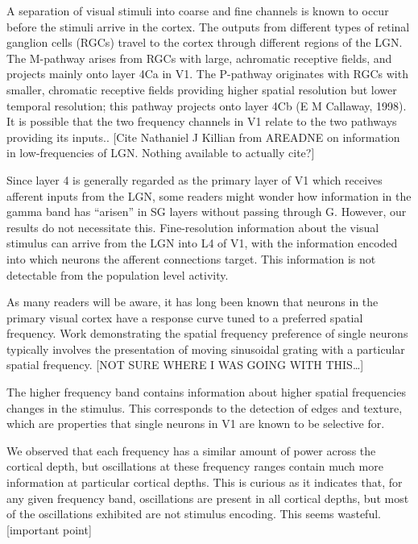 \documentclass{article}
\begin{document}
A separation of visual stimuli into coarse and fine channels is known to occur before the stimuli arrive in the cortex. The outputs from different types of retinal ganglion cells (RGCs) travel to the cortex through different regions of the LGN. The M-pathway arises from RGCs with large, achromatic receptive fields, and projects mainly onto layer 4C\textgreek{a }in V1. The P-pathway originates with RGCs with smaller, chromatic receptive fields providing higher spatial resolution but lower temporal resolution; this pathway projects onto layer 4C\textgreek{b (}E M Callaway, 1998). It is possible that the two frequency channels in V1 relate to the two pathways providing its inputs.. [Cite Nathaniel J Killian from AREADNE on information in low-frequencies of LGN. Nothing available to actually cite?]

Since layer 4 is generally regarded as the primary layer of V1 which receives afferent inputs from the LGN, some readers might wonder how information in the gamma band has ``arisen'' in SG layers without passing through G. However, our results do not necessitate this. Fine-resolution information about the visual stimulus can arrive from the LGN into L4 of V1, with the information encoded into which neurons the afferent connections target. This information is not detectable from the population level activity. 

As many readers will be aware, it has long been known that neurons in the primary visual cortex have a response curve tuned to a preferred spatial frequency. Work demonstrating the spatial frequency preference of single neurons typically involves the presentation of moving sinusoidal grating with a particular spatial frequency. [NOT SURE WHERE I WAS GOING WITH THIS{\dots}]

The higher frequency band contains information about higher spatial frequencies changes in the stimulus. This corresponds to the detection of edges and texture, which are properties that single neurons in V1 are known to be selective for. 

We observed that each frequency has a similar amount of power across the cortical depth, but oscillations at these frequency ranges contain much more information at particular cortical depths. This is curious as it indicates that, for any given frequency band, oscillations are present in all cortical depths, but most of the oscillations exhibited are not stimulus encoding. This seems wasteful. [important point]
\end{document}
